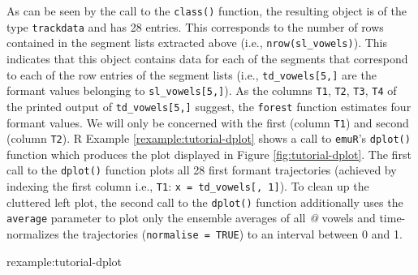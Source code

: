 \documentclass[]{book}
\newenvironment{Shaded}{\begin{snugshade}}{\end{snugshade}}
\newcommand{\CommentTok}[1]{\textcolor[rgb]{0.56,0.35,0.01}{\textit{#1}}}
\newcommand{\DataTypeTok}[1]{\textcolor[rgb]{0.13,0.29,0.53}{#1}}
\newcommand{\DecValTok}[1]{\textcolor[rgb]{0.00,0.00,0.81}{#1}}
\newcommand{\KeywordTok}[1]{\textcolor[rgb]{0.13,0.29,0.53}{\textbf{#1}}}
\newcommand{\NormalTok}[1]{#1}
\newcommand{\OperatorTok}[1]{\textcolor[rgb]{0.81,0.36,0.00}{\textbf{#1}}}
\newcommand{\OtherTok}[1]{\textcolor[rgb]{0.56,0.35,0.01}{#1}}
\newcommand{\StringTok}[1]{\textcolor[rgb]{0.31,0.60,0.02}{#1}}
\theoremstyle{definition}
\theoremstyle{definition}
\theoremstyle{definition}
\theoremstyle{remark}
\begin{document}
As can be seen by the call to the \texttt{class()} function, the
resulting object is of the type \texttt{trackdata} and has 28 entries.
This corresponds to the number of rows contained in the segment lists
extracted above (i.e., \texttt{nrow(sl\_vowels)}). This indicates that
this object contains data for each of the segments that correspond to
each of the row entries of the segment lists (i.e.,
\texttt{td\_vowels{[}5,{]}} are the formant values belonging to
\texttt{sl\_vowels{[}5,{]}}). As the columns \texttt{T1}, \texttt{T2},
\texttt{T3}, \texttt{T4} of the printed output of
\texttt{td\_vowels{[}5,{]}} suggest, the \texttt{forest} function
estimates four formant values. We will only be concerned with the first
(column \texttt{T1}) and second (column \texttt{T2}). R Example
\ref{rexample:tutorial-dplot} shows a call to \texttt{emuR}'s
\texttt{dplot()} function which produces the plot displayed in Figure
\ref{fig:tutorial-dplot}. The first call to the \texttt{dplot()}
function plots all 28 first formant trajectories (achieved by indexing
the first column i.e., \texttt{T1}:
\texttt{x\ =\ td\_vowels{[},\ 1{]}}). To clean up the cluttered left
plot, the second call to the \texttt{dplot()} function additionally uses
the \texttt{average} parameter to plot only the ensemble averages of all
\emph{@} vowels and time-normalizes the trajectories
(\texttt{normalise\ =\ TRUE}) to an interval between 0 and 1.

rexample:tutorial-dplot

\begin{Shaded}
\end{Shaded}
\end{document}
